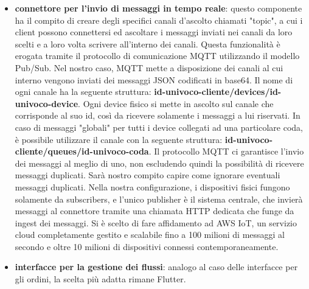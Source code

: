 \documentclass[a4paper, titlepage, 12pt, openright, oneside]{book}
\begin{document}
\begin{itemize}
	\item \textbf{connettore per l'invio di messaggi in tempo reale}: questo componente ha il compito di creare degli specifici canali d'ascolto chiamati "topic",
				 a cui i client possono connettersi ed ascoltare i messaggi inviati nei canali da loro scelti e a loro volta scrivere all'interno dei canali. Questa funzionalità è erogata tramite il protocollo di comunicazione MQTT utilizzando il modello Pub/Sub. Nel nostro caso, MQTT mette a disposizione dei canali al cui interno vengono inviati
				 dei messaggi JSON codificati in base64. Il nome di ogni canale ha la seguente struttura: \textbf{id-univoco-cliente/devices/id-univoco-device}.
				 Ogni device fisico si mette in ascolto sul canale che corrisponde al suo id, così da ricevere solamente i messaggi a lui riservati. In caso di messaggi "globali"
				 per tutti i device collegati ad una particolare coda, è possibile utilizzare il canale con la seguente struttura: \textbf{id-univoco-cliente/queues/id-univoco-coda}.
				 Il protocollo MQTT ci garantisce l'invio dei messaggi al meglio di uno, non escludendo quindi la possibilità di ricevere messaggi duplicati. Sarà nostro compito
				 capire come ignorare eventuali messaggi duplicati. Nella nostra configurazione, i dispositivi fisici fungono solamente da subscribers, e l'unico publisher è 
				 il sistema centrale, che invierà messaggi al connettore tramite una chiamata HTTP dedicata che funge da ingest dei messaggi. 
				 Si è scelto di fare affidamento ad AWS IoT, un servizio cloud completamente gestito e scalabile fino a 100 milioni
				 di messaggi al secondo e oltre 10 milioni di dispositivi connessi contemporaneamente.
				 
	\item \textbf{interfacce per la gestione dei flussi}: analogo al caso delle interfacce per gli ordini, la scelta più adatta rimane Flutter.
	
\end{itemize}
\end{document}

